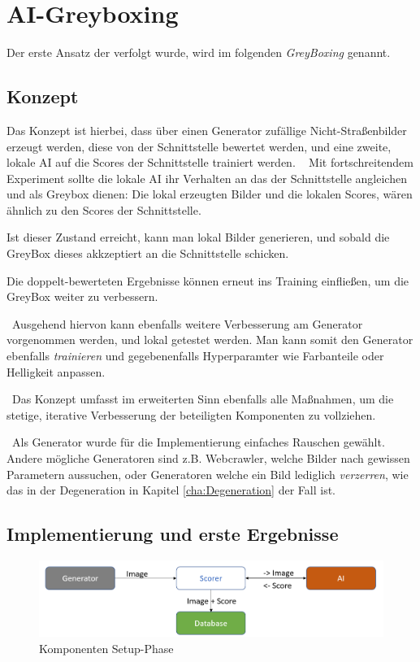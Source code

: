\chapter{AI-Greyboxing}
\label{Cha:GreyBoxing}
Der erste Ansatz der verfolgt wurde, wird im folgenden \textit{GreyBoxing} genannt.
\section{Konzept}
\label{sec:KonzeptGreyBoxing}
Das Konzept ist hierbei, dass über einen Generator zufällige Nicht-Straßenbilder erzeugt werden, diese von der Schnittstelle bewertet werden, und eine zweite, lokale AI auf die Scores der Schnittstelle trainiert werden. 
~\newline
Mit fortschreitendem Experiment sollte die lokale AI ihr Verhalten an das der Schnittstelle angleichen und als Greybox dienen: Die lokal erzeugten Bilder und die lokalen Scores, wären ähnlich zu den Scores der Schnittstelle. 

Ist dieser Zustand erreicht, kann man lokal Bilder generieren, und sobald die GreyBox dieses akkzeptiert an die Schnittstelle schicken. 

Die doppelt-bewerteten Ergebnisse können erneut ins Training einfließen, um die GreyBox weiter zu verbessern. 

~\newline Ausgehend hiervon kann ebenfalls weitere Verbesserung am Generator vorgenommen werden, und lokal getestet werden.
Man kann somit den Generator ebenfalls \textit{trainieren} und gegebenenfalls Hyperparamter wie Farbanteile oder Helligkeit anpassen. 

~\newline Das Konzept umfasst im erweiterten Sinn ebenfalls alle Maßnahmen, um die stetige, iterative Verbesserung der beteiligten Komponenten zu vollziehen.      

~\newline Als Generator wurde für die Implementierung einfaches Rauschen gewählt. Andere mögliche Generatoren sind z.B. Webcrawler, welche Bilder nach gewissen Parametern aussuchen, oder Generatoren welche ein Bild lediglich \textit{verzerren}, wie das in der Degeneration in Kapitel \ref{cha:Degeneration} der Fall ist. 

\section{Implementierung und erste Ergebnisse}
\label{sec:ImplementierungGreyBoxing}
\begin{figure}[h]
	\centering
	\includegraphics[width=0.9\linewidth]{Images/GreyBoxingStart}
	\caption[Komponenten Setup-Phase]{Komponenten Setup-Phase}
	\label{fig:greyboxingstart}
\end{figure}

